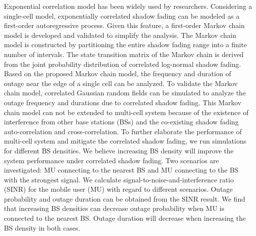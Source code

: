 \par Exponential correlation model \cite{gudmundson1991correlation} has been widely used by researchers. Considering a single-cell model, exponentially correlated shadow fading can be modeled as a first-order autoregressive process. Given this feature, a first-order Markov chain model is developed and validated  to simplify the analysis. The Markov chain model is constructed by partitioning the entire shadow fading range into a finite number of intervals. The state transition matrix of the Markov chain is derived from the joint probability distribution of correlated log-normal shadow fading. Based on the proposed Markov chain model, the frequency and duration of outage near the edge of a single cell can be analyzed. To validate the Markov chain model, correlated Gaussian random fields can be simulated to analyze the outage frequency and durations due to correlated shadow fading. 
This Markov chain model can not be extended to multi-cell system because of the existence of interference from other base stations (BSs) and the co-existing shadow fading auto-correlation and cross-correlation. To further elaborate the performance of multi-cell system and mitigate the correlated shadow fading, we run simulations for different BS densities. We believe increasing BS density will improve the system performance under correlated shadow fading. Two scenarios are investigated: MU connecting to the nearest BS and MU connecting to the BS with the strongest signal. We calculate signal-to-noise-and-interference ratio (SINR) for the mobile user (MU) with regard to different scenarios. Outage probability and outage duration can be obtained from the SINR result. We find that increasing BS densities can decrease outage probability when MU is connected to the nearest BS. Outage duration will decrease when increasing the BS density in both cases. 


